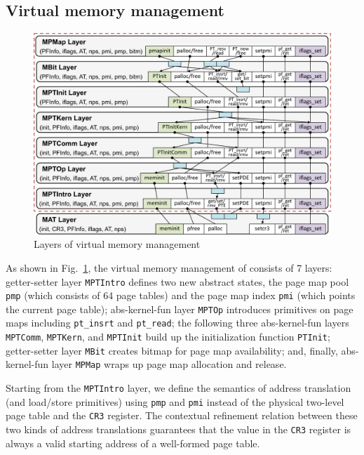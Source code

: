 \subsection{Virtual memory management}
\label{sec:base:vmm} 

\begin{figure}
\begin{center}
\includegraphics[scale=0.31]{figs/vmm_layer}	
\caption{Layers of virtual memory management}
\label{fig:base:vmm:layers}
\end{center}
\vspace*{-14pt}
\end{figure}

As shown in
Fig.\ \ref{fig:base:vmm:layers}, the virtual memory management of
\mCTOSbase{} consists of 7 layers: getter-setter layer \verb"MPTIntro"
defines two new abstract states, the page map pool \verb"pmp" (which
consists of 64 page tables) and the page map index \verb"pmi" (which
points the current page table); abs-kernel-fun layer \verb"MPTOp"
introduces primitives on page maps including \verb"pt_insrt" and
\verb"pt_read"; the following three abs-kernel-fun layers
\verb"MPTComm", \verb"MPTKern", and \verb"MPTInit" build up the
initialization function \verb"PTInit"; getter-setter layer \verb"MBit"
creates bitmap for page map availability; and, finally,
abs-kernel-fun layer \verb"MPMap" wraps up page map allocation and
release.

Starting from the \verb"MPTIntro" layer, we define the semantics of
address translation (and load/store primitives)
using \verb"pmp" and \verb"pmi" instead of the physical two-level page
table and the \verb"CR3" register.  The contextual refinement relation
between these two kinds of address translations guarantees that the
value in the \verb"CR3" register is always a valid starting address of
a well-formed page table.

